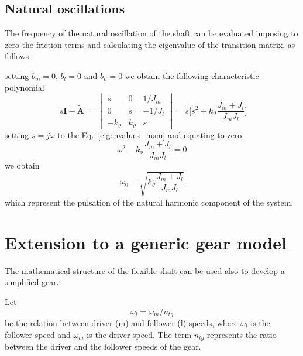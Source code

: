 \documentclass[12pt,a4paper]{scrartcl}
\begin{document}
\begin{onehalfspace}
\subsection{Natural oscillations}
The frequency of the natural oscillation of the shaft can be evaluated imposing to zero the friction terms and calculating the eigenvalue of the transition matrix, as follows

\noindent setting $b_m=0$,  $b_l=0$ and $b_\vartheta=0$ we obtain the following characteristic polynomial
\begin{equation}\label{eigenvalues_msm}
	\Big|s\mathbf{I}-\tilde{\mathbf{A}}\Big|=\begin{vmatrix}
		s & 0 & 1/J_m \\[6pt]
		0 & s & -1/J_l \\[6pt]
		-k_\vartheta & k_\vartheta & s 
	\end{vmatrix} = s\Big[s^2+k_\vartheta\frac{J_m+J_l}{J_mJ_l}\Big]
\end{equation}
setting $s=j\omega$ to the Eq.~\eqref{eigenvalues_msm} and equating to zero
\begin{equation}
	\omega^2-k_\vartheta\frac{J_m+J_l}{J_mJ_l}=0
\end{equation}
we obtain
\begin{equation}
		\omega_0=\sqrt{k_\vartheta\frac{J_m+J_l}{J_mJ_l}}
\end{equation}
which represent the pulsation of the natural harmonic component of the system.

\section{Extension to a generic gear model}
The mathematical structure of the flexible shaft can be used also to develop a simplified gear.

Let
\begin{equation}
	\omega_l=\omega_m/n_{tg}
\end{equation}
be the relation between driver (m) and follower (l) speeds, where $\omega_l$ is the follower speed and $\omega_m$ is the driver speed. The term $n_{tg}$ represents the ratio between the driver and the follower speeds of the gear.


\end{onehalfspace}
\end{document}
